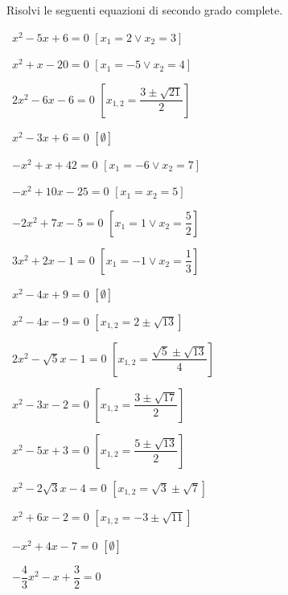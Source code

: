 
\begin{esercizio}[\Ast]
 \label{ese:3.12}
Risolvi le seguenti equazioni di secondo grado complete.
\begin{multicols}{2}
 \begin{enumeratea}
 \item~$x^{2}-5 x + 6=0$
  \hfill$\left[x_{1} = 2 \vee x_{2} = 3\right]$
 \item~$x^{2} + x-20=0$
  \hfill$\left[x_{1} =-5 \vee x_{2} = 4\right]$
 \item~$2 x^{2}-6 x-6=0$
  \hfill$\left[x_{1,2} = \dfrac{3 \pm \sqrt{21}}{2}\right]$
 \item~$x^{2}-3 x + 6=0$
  \hfill$\left[\emptyset\right]$
 \item~$- x^{2} + x + 42=0$
  \hfill$\left[x_{1} =-6 \vee x_{2} = 7\right]$
 \item~$- x^{2} + 10 x-25=0$
  \hfill$\left[x_{1} = x_{2} = 5\right]$
 \item~$- 2 x^{2} + 7 x-5=0$
  \hfill$\left[x_{1} = 1 \vee x_{2} = \dfrac{5}{2}\right]$
 \item~$3 x^{2} + 2 x-1=0$
  \hfill$\left[x_{1} =-1 \vee x_{2} = \dfrac{1}{3}\right]$
 \item~$x^{2}-4 x + 9 = 0$
  \hfill$\left[\emptyset\right]$
 \item~$x^{2}-4 x-9 = 0$
  \hfill$\left[x_{1,2} = 2 \pm \sqrt{13}\right]$
 \item~$2 x^{2}-\sqrt{5} x-1 = 0$
  \hfill$\left[x_{1,2} = \dfrac{\sqrt{5} \pm \sqrt{13}}{4}\right]$
 \item~$x^{2}-3 x-2=0$
  \hfill$\left[x_{1,2} = \dfrac{3 \pm \sqrt{17}}{2}\right]$
 \item~$x^{2}-5 x + 3 = 0$
  \hfill$\left[x_{1,2} = \dfrac{5 \pm \sqrt{13}}{2}\right]$
 \item~$x^{2}-2 \sqrt{3} x-4=0$
  \hfill$\left[x_{1,2} = \sqrt{3} \pm \sqrt{7}\right]$
 \item~$x^{2} + 6 x-2 = 0$
  \hfill$\left[x_{1,2} =-3 \pm \sqrt{11}\right]$
 \item~$- x^{2} + 4 x-7=0$
  \hfill$\left[\emptyset\right]$
 \item~$- \dfrac{4}{3} x^{2}-x + \dfrac{3}{2}=0$

\end{enumeratea}
\end{multicols}
\end{esercizio}
